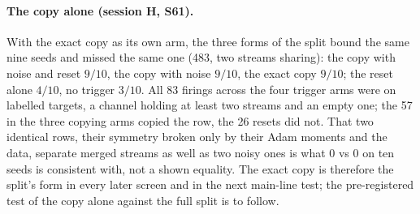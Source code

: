 \documentclass[11pt]{article}
\begin{document}
\paragraph{The copy alone (session H, S61).} With the exact copy as its own arm, the three forms of the split bound the same nine seeds and missed the same one (483, two streams sharing): the copy with noise and reset $9/10$, the copy with noise $9/10$, the exact copy $9/10$; the reset alone $4/10$, no trigger $3/10$. All 83 firings across the four trigger arms were on labelled targets, a channel holding at least two streams and an empty one; the 57 in the three copying arms copied the row, the 26 resets did not. That two identical rows, their symmetry broken only by their Adam moments and the data, separate merged streams as well as two noisy ones is what 0 vs 0 on ten seeds is consistent with, not a shown equality. The exact copy is therefore the split's form in every later screen and in the next main-line test; the pre-registered test of the copy alone against the full split is to follow.
\end{document}
